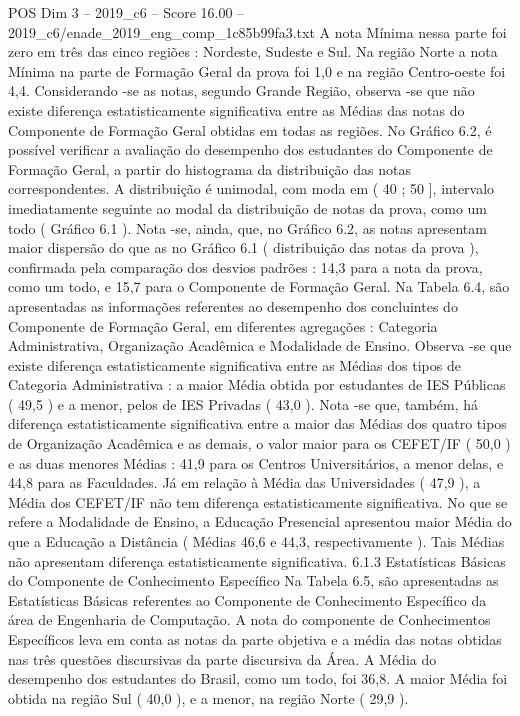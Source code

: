 \begin{textsample}{POS Dim 3 – 2019\_c6 – Score 16.00 – 2019\_c6/enade\_2019\_eng\_comp\_1c85b99fa3.txt}
A nota Mínima nessa parte foi zero em três das cinco regiões : Nordeste, Sudeste e Sul.
Na região Norte a nota Mínima na parte de Formação Geral da prova foi 1,0 e na região Centro-oeste foi 4,4.
Considerando -se as notas, segundo Grande Região, observa -se que não existe diferença estatisticamente significativa entre as Médias das notas do Componente de Formação Geral obtidas em todas as regiões.
No Gráfico 6.2, é possível verificar a avaliação do desempenho dos estudantes do Componente de Formação Geral, a partir do histograma da distribuição das notas correspondentes.
A distribuição é unimodal, com moda em ( 40 ; 50 ], intervalo imediatamente seguinte ao modal da distribuição de notas da prova, como um todo ( Gráfico 6.1 ).
Nota -se, ainda, que, no Gráfico 6.2, as notas apresentam maior dispersão do que as no Gráfico 6.1 ( distribuição das notas da prova ), confirmada pela comparação dos desvios padrões : 14,3 para a nota da prova, como um todo, e 15,7 para o Componente de Formação Geral.
Na Tabela 6.4, são apresentadas as informações referentes ao desempenho dos concluintes do Componente de Formação Geral, em diferentes agregações : Categoria Administrativa, Organização Acadêmica e Modalidade de Ensino.
Observa -se que existe diferença estatisticamente significativa entre as Médias dos tipos de Categoria Administrativa : a maior Média obtida por estudantes de IES Públicas ( 49,5 ) e a menor, pelos de IES Privadas ( 43,0 ).
Nota -se que, também, há diferença estatisticamente significativa entre a maior das Médias dos quatro tipos de Organização Acadêmica e as demais, o valor maior para os CEFET/IF ( 50,0 ) e as duas menores Médias : 41,9 para os Centros Universitários, a menor delas, e 44,8 para as Faculdades.
Já em relação à Média das Universidades ( 47,9 ), a Média dos CEFET/IF não tem diferença estatisticamente significativa.
No que se refere a Modalidade de Ensino, a Educação Presencial apresentou maior Média do que a Educação a Distância ( Médias 46,6 e 44,3, respectivamente ).
Tais Médias não apresentam diferença estatisticamente significativa. 6.1.3 Estatísticas Básicas do Componente de Conhecimento Específico Na Tabela 6.5, são apresentadas as Estatísticas Básicas referentes ao Componente de Conhecimento Específico da área de Engenharia de Computação.
A nota do componente de Conhecimentos Específicos leva em conta as notas da parte objetiva e a média das notas obtidas nas três questões discursivas da parte discursiva da Área.
A Média do desempenho dos estudantes do Brasil, como um todo, foi 36,8.
A maior Média foi obtida na região Sul ( 40,0 ), e a menor, na região Norte ( 29,9 ).

\end{textsample}

